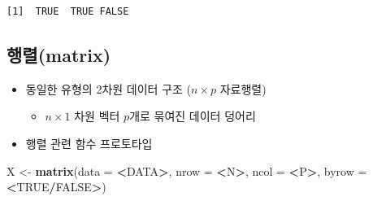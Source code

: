 \documentclass[11pt,a4paper]{book}
\newenvironment{Shaded}{\begin{snugshade}}{\end{snugshade}}
\newcommand{\KeywordTok}[1]{\textcolor[rgb]{0.13,0.29,0.53}{\textbf{#1}}}
\newcommand{\DataTypeTok}[1]{\textcolor[rgb]{0.13,0.29,0.53}{#1}}
\newcommand{\StringTok}[1]{\textcolor[rgb]{0.31,0.60,0.02}{#1}}
\newcommand{\OtherTok}[1]{\textcolor[rgb]{0.56,0.35,0.01}{#1}}
\newcommand{\OperatorTok}[1]{\textcolor[rgb]{0.81,0.36,0.00}{\textbf{#1}}}
\newcommand{\NormalTok}[1]{#1}
\providecommand{\tightlist}{%
  \setlength{\itemsep}{0pt}\setlength{\parskip}{0pt}}
\theoremstyle{definition}
\theoremstyle{definition}
\theoremstyle{definition}
\theoremstyle{remark}
\begin{document}
\begin{Shaded}
\end{Shaded}

\begin{verbatim}
[1]  TRUE  TRUE FALSE
\end{verbatim}

\normalsize

\subsection{행렬(matrix)}\label{matrix}

\begin{itemize}
\tightlist
\item
  동일한 유형의 2차원 데이터 구조 (\(n \times p\) 자료행렬)

  \begin{itemize}
  \tightlist
  \item
    \(n \times 1\) 차원 벡터 \(p\)개로 묶여진 데이터 덩어리
  \end{itemize}
\item
  행렬 관련 함수 프로토타입
\end{itemize}

\footnotesize

\begin{Shaded}
\begin{Highlighting}[]
\NormalTok{X <-}\StringTok{ }\KeywordTok{matrix}\NormalTok{(}\DataTypeTok{data =} \OperatorTok{<}\NormalTok{DATA}\OperatorTok{>}\NormalTok{, }\DataTypeTok{nrow =} \OperatorTok{<}\NormalTok{N}\OperatorTok{>}\NormalTok{, }\DataTypeTok{ncol =} \OperatorTok{<}\NormalTok{P}\OperatorTok{>}\NormalTok{, }\DataTypeTok{byrow =} \OperatorTok{<}\OtherTok{TRUE}\OperatorTok{/}\OtherTok{FALSE}\OperatorTok{>}\NormalTok{)}
\end{Highlighting}
\end{Shaded}

\normalsize
\end{document}
